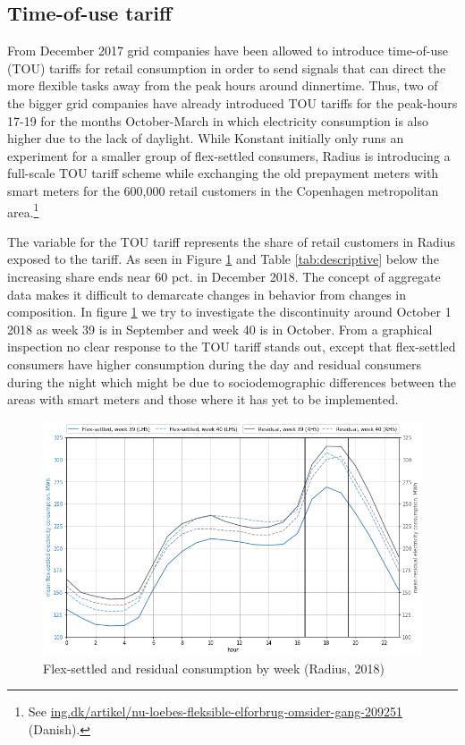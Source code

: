 \subsection{Time-of-use tariff}
\label{subsec:d_tout}
From December 2017 grid companies have been allowed to introduce time-of-use (TOU) tariffs for retail consumption in order to send signals that can direct the more flexible tasks away from the peak hours around dinnertime. Thus, two of the bigger grid companies have already introduced TOU tariffs for the peak-hours 17-19 for the months October-March in which electricity consumption is also higher due to the lack of daylight. While Konstant initially only runs an experiment for a smaller group of flex-settled consumers, Radius is introducing a full-scale TOU tariff scheme while exchanging the old prepayment meters with smart meters for the 600,000 retail customers in the Copenhagen metropolitan area.\footnote{See \href{https://ing.dk/artikel/nu-loebes-fleksible-elforbrug-omsider-gang-209251}{ing.dk/artikel/nu-loebes-fleksible-elforbrug-omsider-gang-209251} (Danish).}
\par
The variable for the TOU tariff represents the share of retail customers in Radius exposed to the tariff. As seen in Figure \ref{fig:radius_w39_w40} and Table \ref{tab:descriptive} below the increasing share ends near 60 pct. in December 2018. The concept of aggregate data makes it difficult to demarcate changes in behavior from changes in composition. In figure \ref{fig:radius_w39_w40} we try to investigate the discontinuity around October 1 2018 as week 39 is in September and week 40 is in October. From a graphical inspection no clear response to the TOU tariff stands out, except that flex-settled consumers have higher consumption during the day and residual consumers during the night which might be due to sociodemographic differences between the areas with smart meters and those where it has yet to be implemented.
\begin{figure}[H]
  \centering
  \caption{Flex-settled and residual consumption by week (Radius, 2018)}
  \label{fig:radius_w39_w40}
      \includegraphics[width=1 \textwidth]{03_figures/radius_w39_w40}
\end{figure}

